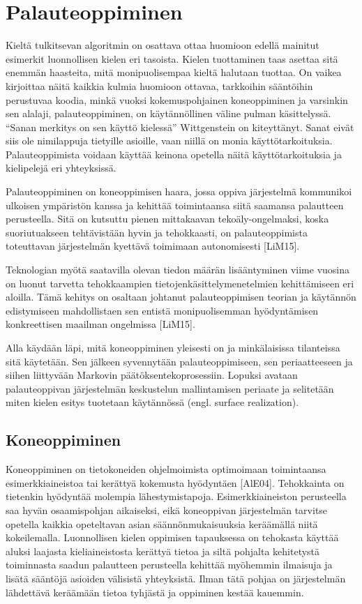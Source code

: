\documentclass[finnish]{tktltiki2}
\theoremstyle{definition}
\theoremstyle{remark}
\begin{document}
\section{Palauteoppiminen}

Kieltä tulkitsevan algoritmin on osattava ottaa huomioon edellä mainitut esimerkit luonnollisen kielen eri tasoista. Kielen tuottaminen taas asettaa sitä enemmän haasteita, mitä monipuolisempaa kieltä halutaan tuottaa. On vaikea kirjoittaa näitä kaikkia kulmia huomioon ottavaa, tarkkoihin sääntöihin perustuvaa koodia, minkä vuoksi kokemuspohjainen koneoppiminen ja varsinkin sen alalaji, palauteoppiminen, on käytännöllinen väline pulman käsittelyssä. “Sanan merkitys on sen käyttö kielessä” Wittgenstein on kiteyttänyt. Sanat eivät siis ole nimilappuja tietyille asioille, vaan niillä on monia käyttötarkoituksia. Palauteoppimista voidaan käyttää keinona opetella näitä käyttötarkoituksia ja kielipelejä eri yhteyksissä. 
 
Palauteoppiminen on koneoppimisen haara, jossa oppiva järjestelmä kommunikoi ulkoisen ympäristön kanssa ja kehittää toimintaansa siitä saamansa palautteen perusteella. Sitä on kutsuttu pienen mittakaavan tekoäly-ongelmaksi, koska suoriutuakseen tehtävistään hyvin ja tehokkaasti, on palauteoppimista toteuttavan järjestelmän kyettävä toimimaan autonomisesti [LiM15]. 
 
Teknologian myötä saatavilla olevan tiedon määrän lisääntyminen viime vuosina on luonut tarvetta tehokkaampien tietojenkäsittelymenetelmien kehittämiseen eri aloilla. Tämä kehitys on osaltaan johtanut palauteoppimisen teorian ja käytännön edistymiseen mahdollistaen sen entistä monipuolisemman hyödyntämisen konkreettisen maailman ongelmissa [LiM15]. 
 
Alla käydään läpi, mitä koneoppiminen yleisesti on ja minkälaisissa tilanteissa sitä käytetään. Sen jälkeen syvennytään palauteoppimiseen, sen periaatteeseen ja siihen liittyvään Markovin päätöksentekoprosessiin. Lopuksi avataan palauteoppivan järjestelmän keskustelun mallintamisen periaate ja selitetään miten kielen esitys tuotetaan käytännössä  (engl. surface realization).

\subsection{Koneoppiminen}

Koneoppiminen on tietokoneiden ohjelmoimista optimoimaan toimintaansa esimerkkiaineistoa tai kerättyä kokemusta hyödyntäen [AlE04]. Tehokkainta on tietenkin hyödyntää molempia lähestymistapoja. Esimerkkiaineiston perusteella saa hyvän osaamispohjan aikaiseksi, eikä koneoppivan järjestelmän tarvitse opetella kaikkia opeteltavan asian säännönmukaisuuksia keräämällä niitä kokeilemalla. Luonnollisen kielen oppimisen tapauksessa on tehokasta käyttää aluksi laajasta kieliaineistosta kerättyä tietoa ja siltä pohjalta kehitetystä toiminnasta saadun palautteen perusteella kehittää myöhemmin ilmaisuja ja lisätä sääntöjä asioiden välisistä yhteyksistä. Ilman tätä pohjaa on järjestelmän lähdettävä keräämään tietoa tyhjästä ja oppiminen kestää kauemmin. 
 
\end{document}
